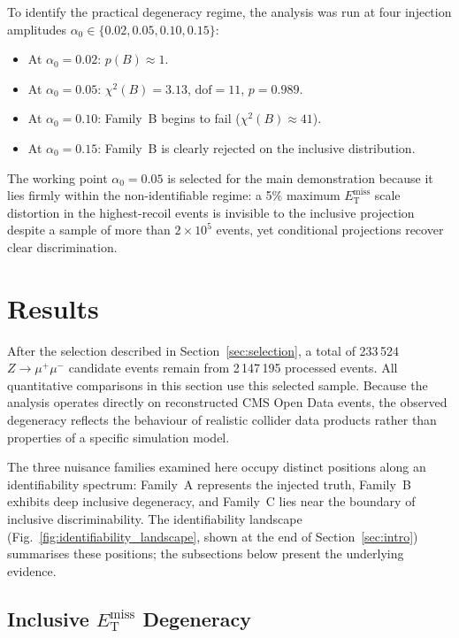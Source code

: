 \documentclass[a4paper,11pt]{article}
\newcommand{\MET}{\ensuremath{E_{\mathrm{T}}^{\mathrm{miss}}}\xspace}
\newcommand{\zmumu}{\ensuremath{Z\!\to\!\mu^+\mu^-}\xspace}
\begin{document}
To identify the practical degeneracy regime, the analysis was run at four
injection amplitudes $\alpha_0 \in \{0.02, 0.05, 0.10, 0.15\}$:
\begin{itemize}
  \item At $\alpha_0 = 0.02$: $p(B) \approx 1$.
  \item At $\alpha_0 = 0.05$: $\chi^2(B) = 3.13$, $\mathrm{dof} = 11$,
    $p = 0.989$.
  \item At $\alpha_0 = 0.10$: Family~B begins to fail ($\chi^2(B)
    \approx 41$).
  \item At $\alpha_0 = 0.15$: Family~B is clearly rejected on the
    inclusive distribution.
\end{itemize}
The working point $\alpha_0 = 0.05$ is selected for the main demonstration
because it lies firmly within the non-identifiable regime: a 5\% maximum
\MET scale distortion in the highest-recoil events is invisible to the
inclusive projection despite a sample of more than $2 \times 10^5$ events,
yet conditional projections recover clear discrimination.

\section{Results}
\label{sec:results}

After the selection described in Section~\ref{sec:selection}, a total of
233\,524 \zmumu candidate events remain from 2\,147\,195 processed events.
All quantitative comparisons in this section use this selected sample.
Because the analysis operates directly on reconstructed CMS Open Data
events, the observed degeneracy reflects the behaviour of realistic collider
data products rather than properties of a specific simulation model.

The three nuisance families examined here occupy distinct positions along an
identifiability spectrum: Family~A represents the injected truth, Family~B
exhibits deep inclusive degeneracy, and Family~C lies near the boundary of
inclusive discriminability.
The identifiability landscape (Fig.~\ref{fig:identifiability_landscape},
shown at the end of Section~\ref{sec:intro}) summarises these positions;
the subsections below present the underlying evidence.

\subsection{Inclusive \texorpdfstring{\MET}{MET} Degeneracy}
\end{document}
